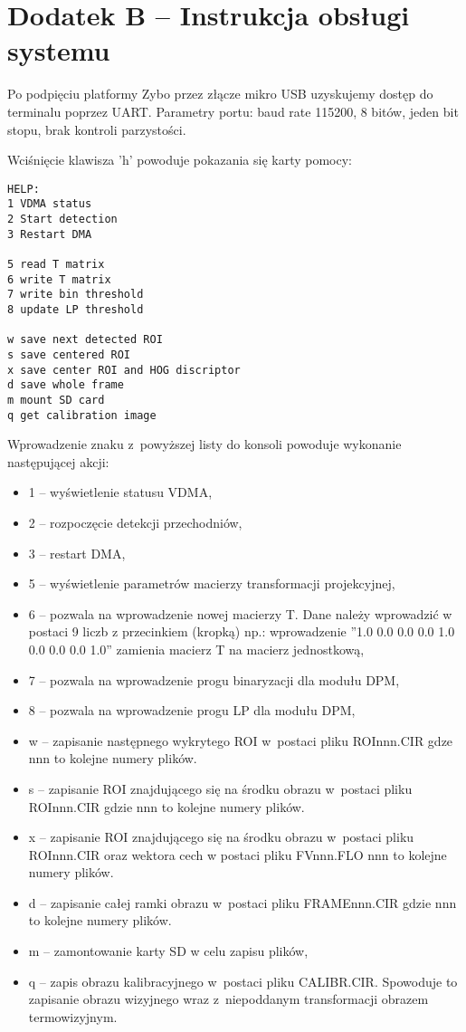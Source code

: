 \chapter{Dodatek B -- Instrukcja obsługi systemu}


Po podpięciu platformy Zybo przez złącze mikro USB uzyskujemy dostęp do terminalu poprzez UART. 
Parametry portu: baud rate 115200, 8 bitów, jeden bit stopu, brak kontroli parzystości.

Wciśnięcie klawisza 'h' powoduje pokazania się karty pomocy:

\begin{lstlisting}
HELP:
1 VDMA status
2 Start detection
3 Restart DMA

5 read T matrix
6 write T matrix
7 write bin threshold
8 update LP threshold

w save next detected ROI
s save centered ROI
x save center ROI and HOG discriptor
d save whole frame
m mount SD card
q get calibration image

\end{lstlisting}
 
\noindent Wprowadzenie znaku z~powyższej listy do konsoli powoduje wykonanie następującej akcji:
 
\begin{itemize}
\item 1 -- wyświetlenie statusu VDMA,
\item 2 -- rozpoczęcie detekcji przechodniów,
\item 3 -- restart DMA,
\item 5 -- wyświetlenie parametrów macierzy transformacji projekcyjnej,
\item 6 -- pozwala na wprowadzenie nowej macierzy T. Dane należy wprowadzić w postaci 9 liczb z przecinkiem (kropką) np.: wprowadzenie ''1.0 0.0 0.0 0.0 1.0 0.0 0.0 0.0 1.0'' zamienia macierz T na macierz jednostkową,
\item 7 -- pozwala na wprowadzenie progu binaryzacji dla modułu DPM,
\item 8 -- pozwala na wprowadzenie progu LP dla modułu DPM,
\item w -- zapisanie następnego wykrytego ROI w~postaci pliku ROInnn.CIR gdze nnn to kolejne numery plików.
\item s -- zapisanie ROI znajdującego się na środku obrazu w~postaci pliku ROInnn.CIR gdzie nnn to kolejne numery plików.
\item x -- zapisanie ROI znajdującego się na środku obrazu w~postaci pliku ROInnn.CIR  oraz wektora cech w postaci pliku FVnnn.FLO nnn to kolejne numery plików.
\item d -- zapisanie całej ramki obrazu w~postaci pliku FRAMEnnn.CIR gdzie nnn to kolejne numery plików.
\item m -- zamontowanie karty SD w celu zapisu plików,
\item q -- zapis obrazu kalibracyjnego w~postaci pliku CALIBR.CIR. Spowoduje to zapisanie obrazu wizyjnego wraz z~niepoddanym transformacji obrazem termowizyjnym.
\end{itemize}


